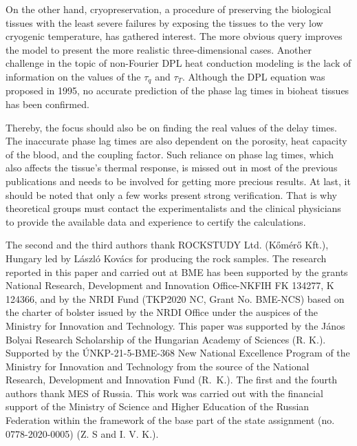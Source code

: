 \documentclass[sn-mathphys]{sn-jnl}%
\theoremstyle{thmstyleone}%
\theoremstyle{thmstyletwo}%
\theoremstyle{thmstylethree}%
\begin{document}
On the other hand, cryopreservation, a procedure of preserving the biological tissues with the least severe failures by exposing the tissues to the very low cryogenic temperature, has gathered interest. The more obvious query improves the model to present the more realistic three-dimensional cases. Another challenge in the topic of non-Fourier DPL heat conduction modeling is the lack of information on the values of the $\tau_q$ and $\tau_T$. Although the DPL equation was proposed in 1995, no accurate prediction of the phase lag times in bioheat tissues has been confirmed.

Thereby, the focus should also be on finding the real values of the delay times. The inaccurate phase lag times are also dependent on the porosity, heat capacity of the blood, and the coupling factor. Such reliance on phase lag times, which also affects the tissue's thermal response, is missed out in most of the previous publications and needs to be involved for getting more precious results. At last, it should be noted that only a few works present strong verification. That is why theoretical groups must contact the experimentalists and the clinical physicians to provide the available data and experience to certify the calculations.



The second and the third authors thank ROCKSTUDY Ltd. (K\H om\'er\H o Kft.), Hungary led by L\'aszl\'o Kov\'acs for producing the rock samples. The research reported in this paper and carried out at BME has been supported by the grants National Research, Development and Innovation Office-NKFIH FK 134277, K 124366, and by the NRDI Fund (TKP2020 NC, Grant No. BME-NCS) based on the charter of bolster issued by the NRDI Office under the auspices of the Ministry for Innovation and Technology. This paper was supported by the J\'anos Bolyai Research Scholarship of the Hungarian Academy of Sciences (R. K.). Supported by the ÚNKP-21-5-BME-368 New National Excellence Program of the Ministry for Innovation and Technology from the source of the National Research, Development and Innovation Fund (R.~K.). The first and the fourth authors thank MES of Russia. This work was carried out with the financial support of the Ministry of Science and Higher Education of the Russian Federation within the framework of the base part of the state assignment (no. 0778-2020-0005) (Z. S and I. V. K.).


\end{document}
